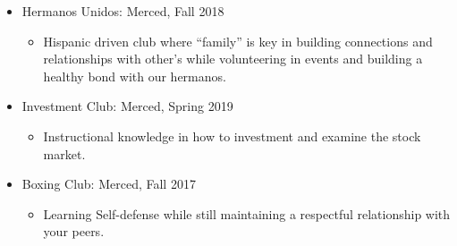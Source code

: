 \documentclass[11pt]{article}
\begin{document}
\begin{itemize}

\item Hermanos Unidos: Merced, Fall 2018    
\begin{itemize}
     \item  Hispanic driven club where “family” is key in building connections and relationships with other’s while volunteering in events and building a healthy bond with our hermanos. 
\end{itemize}   
                                                                             
\item Investment Club: Merced, Spring 2019
\begin{itemize}
     \item  Instructional knowledge in how to investment and examine the stock market. 
\end{itemize}    

\item Boxing Club: Merced, Fall 2017
\begin{itemize}
     \item Learning Self-defense while still maintaining a respectful relationship with your peers. 
\end{itemize}  
                                                                                             

\end{itemize}
\end{document}
